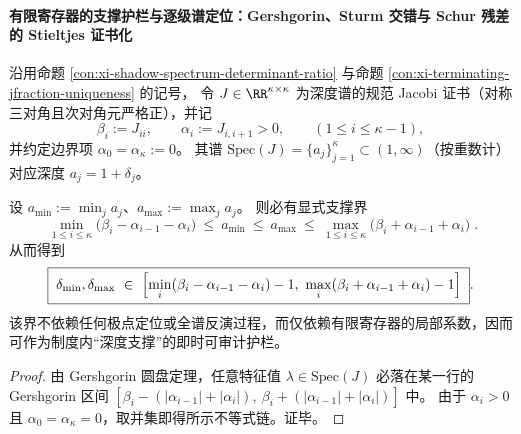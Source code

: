 \paragraph{有限寄存器的支撑护栏与逐级谱定位：Gershgorin、Sturm 交错与 Schur 残差的 Stieltjes 证书化}
沿用命题 \ref{con:xi-shadow-spectrum-determinant-ratio} 与命题 \ref{con:xi-terminating-jfraction-uniqueness} 的记号，
令 \(J\in\RR^{\kappa\times\kappa}\) 为深度谱的规范 Jacobi 证书（对称三对角且次对角元严格正），并记
\[
\beta_i:=J_{ii},
\qquad
\alpha_i:=J_{i,i+1}>0,
\qquad (1\le i\le \kappa-1),
\]
并约定边界项 \(\alpha_0=\alpha_\kappa:=0\)。
其谱 \(\mathrm{Spec}(J)=\{a_j\}_{j=1}^{\kappa}\subset(1,\infty)\)（按重数计）对应深度 \(a_j=1+\delta_j\)。

\begin{proposition}\label{prop:xi-jacobi-gershgorin-support-guardrail}
设 \(a_{\min}:=\min_j a_j\)、\(a_{\max}:=\max_j a_j\)。
则必有显式支撑界
\[
\boxed{\;
\min_{1\le i\le \kappa}\bigl(\beta_i-\alpha_{i-1}-\alpha_i\bigr)
\ \le\ a_{\min}\ \le\ a_{\max}\ \le\
\max_{1\le i\le \kappa}\bigl(\beta_i+\alpha_{i-1}+\alpha_i\bigr)\; }.
\]
从而得到
\[
\boxed{\;
\delta_{\min},\delta_{\max}\ \in\
\Bigl[\min_{i}(\beta_i-\alpha_{i-1}-\alpha_i)-1,\ \max_{i}(\beta_i+\alpha_{i-1}+\alpha_i)-1\Bigr]\; }.
\]
该界不依赖任何极点定位或全谱反演过程，而仅依赖有限寄存器的局部系数，因而可作为制度内“深度支撑”的即时可审计护栏。
\end{proposition}
\begin{proof}
由 Gershgorin 圆盘定理，任意特征值 \(\lambda\in\mathrm{Spec}(J)\) 必落在某一行的 Gershgorin 区间
\(
[\beta_i-(|\alpha_{i-1}|+|\alpha_i|),\ \beta_i+(|\alpha_{i-1}|+|\alpha_i|)]
\) 中。
由于 \(\alpha_i>0\) 且 \(\alpha_0=\alpha_\kappa=0\)，取并集即得所示不等式链。证毕。
\end{proof}

